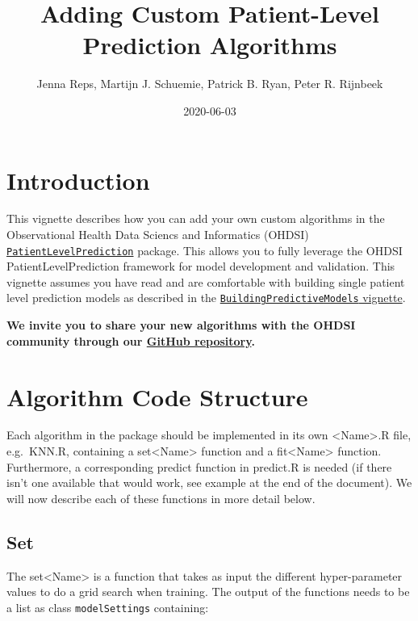 \documentclass[
]{article}
\title{Adding Custom Patient-Level Prediction Algorithms}
\author{Jenna Reps, Martijn J. Schuemie, Patrick B. Ryan, Peter R. Rijnbeek}
\date{2020-06-03}
\begin{document}
\maketitle

{
\setcounter{tocdepth}{2}
\tableofcontents
}
\hypertarget{introduction}{%
\section{Introduction}\label{introduction}}

This vignette describes how you can add your own custom algorithms in
the Observational Health Data Sciencs and Informatics (OHDSI)
\href{http://github.com/OHDSI/PatientLevelPrediction}{\texttt{PatientLevelPrediction}}
package. This allows you to fully leverage the OHDSI
PatientLevelPrediction framework for model development and validation.
This vignette assumes you have read and are comfortable with building
single patient level prediction models as described in the
\href{https://github.com/OHDSI/PatientLevelPrediction/blob/master/inst/doc/BuildingPredictiveModels.pdf}{\texttt{BuildingPredictiveModels}
vignette}.

\textbf{We invite you to share your new algorithms with the OHDSI
community through our
\href{http://github.com/OHDSI/PatientLevelPrediction}{GitHub
repository}.}

\hypertarget{algorithm-code-structure}{%
\section{Algorithm Code Structure}\label{algorithm-code-structure}}

Each algorithm in the package should be implemented in its own
\textless Name\textgreater.R file, e.g.~KNN.R, containing a
set\textless Name\textgreater{} function and a
fit\textless Name\textgreater{} function. Furthermore, a corresponding
predict function in predict.R is needed (if there isn't one available
that would work, see example at the end of the document). We will now
describe each of these functions in more detail below.

\hypertarget{set}{%
\subsection{Set}\label{set}}

The set\textless Name\textgreater{} is a function that takes as input
the different hyper-parameter values to do a grid search when training.
The output of the functions needs to be a list as class
\texttt{modelSettings} containing:
\end{document}
